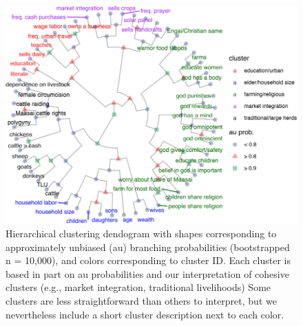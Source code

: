 \documentclass[
  11pt,
]{article}
\begin{document}
\begin{figure}
\centering
\includegraphics{trust-advice-writeup_files/figure-latex/treeplot-1.pdf}
\caption{Hierarchical clustering dendogram with shapes corresponding to
approximately unbiased (au) branching probabilities (bootstrapped n =
10,000), and colors corresponding to cluster ID. Each cluster is based
in part on au probabilities and our interpretation of cohesive clusters
(e.g., market integration, traditional livelihoods) Some clusters are
less straightforward than others to interpret, but we nevertheless
include a short cluster description next to each color.}
\end{figure}
\end{document}

